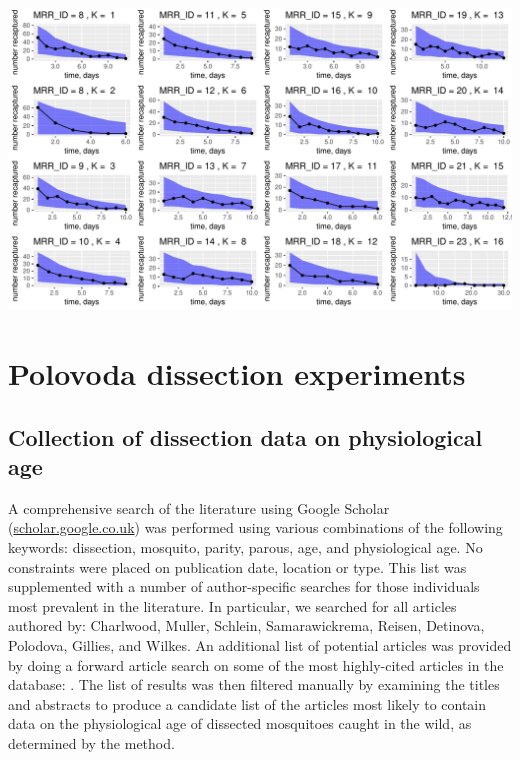 \documentclass[12pt]{article}
\begin{document}
{{%
	\includegraphics[page=3,scale=.6]{./Figure_files/mrr_ppcs_all}
	\label{fig:mrr_ppc3}
	\par
}




\section{Polovoda dissection experiments}

\subsection{Collection of dissection data on physiological age}\label{sec:dissection_dissectionData}
A comprehensive search of the literature using Google Scholar (\url{scholar.google.co.uk}) was performed using various combinations of the following keywords: dissection, mosquito, parity, parous, age, and physiological age. No constraints were placed on publication date, location or type. This list was supplemented with a number of author-specific searches for those individuals most prevalent in the literature. In particular, we searched for all articles authored by: Charlwood, Muller, Schlein, Samarawickrema, Reisen, Detinova, Polodova, Gillies, and Wilkes. An additional list of potential articles was provided by doing a forward article search on some of the most highly-cited articles in the database: \cite{polovodova1949determination,detinova1962age,gillies1965study,clements1981analysis}. The list of results was then filtered manually by examining the titles and abstracts to produce a candidate list of the articles most likely to contain data on the physiological age of dissected mosquitoes caught in the wild, as determined by the \cite{polovodova1949determination} method.

}
\end{document}
